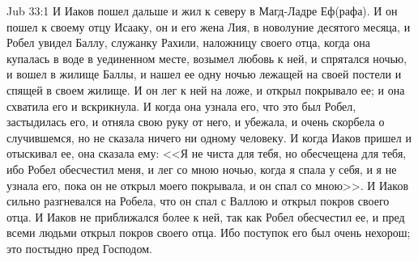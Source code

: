\vs Jub 33:1
И Иаков пошел дальше и жил к северу в Магд-Ладре
Еф(рафа). И он пошел к своему отцу Исааку, он и его
жена Лия, в новолуние десятого месяца, и Робел
увидел Баллу, служанку Рахили, наложницу своего
отца, когда она купалась в воде в уединенном
месте, возымел любовь к ней, и спрятался ночью, и
вошел в жилище Баллы, и нашел ее одну ночью
лежащей на своей постели и спящей в своем жилище.
И он лег к ней на ложе, и открыл покрывало ее; и она
схватила его и вскрикнула. И когда она узнала его,
что это был Робел, застыдилась его, и отняла свою
руку от него, и убежала, и очень скорбела о
случившемся, но не сказала ничего ни одному
человеку. И когда Иаков пришел и отыскивал ее, она
сказала ему: <<Я не чиста для тебя, но обесчещена
для тебя, ибо Робел обесчестил меня, и лег со мною
ночью, когда я спала у себя, и я не узнала его, пока
он не открыл моего покрывала, и он спал со
мною>>. И Иаков сильно разгневался на Робела,
что он спал с Валлою и открыл покров своего
отца. И Иаков не приближался более к ней, так как
Робел обесчестил ее, и пред всеми людьми открыл
покров своего отца. Ибо поступок его был очень
нехорош; это постыдно пред Господом.

